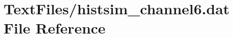 \hypertarget{TextFiles_2histsim__channel6_8dat}{}\section{Text\+Files/histsim\+\_\+channel6.dat File Reference}
\label{TextFiles_2histsim__channel6_8dat}

